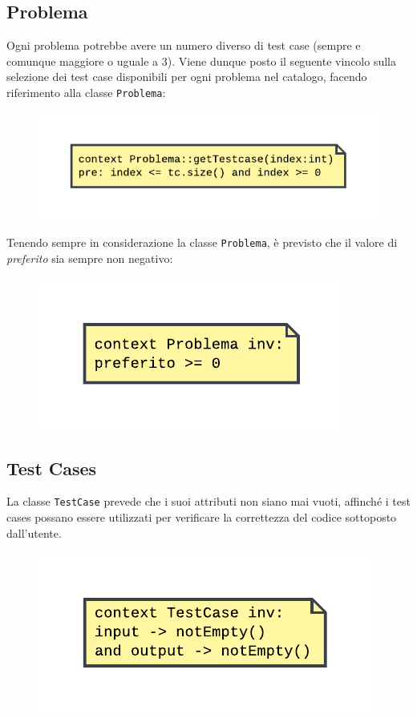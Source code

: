 \documentclass[11pt, a4paper]{article}
\theoremstyle{definition} %
\begin{document}
\subsection{Problema}
Ogni problema potrebbe avere un numero diverso di test case (sempre e
comunque maggiore o uguale a 3). Viene dunque posto il seguente vincolo
sulla selezione dei test case disponibili per ogni problema nel catalogo,
facendo riferimento alla classe \texttt{Problema}:
\begin{figure}[H]
\centering
\includegraphics[scale = 1.1]{materiale/ocl-problemaindicetc.pdf}
\end{figure}

\noindent Tenendo sempre in considerazione la classe \texttt{Problema}, è
previsto che il valore di \textit{preferito} sia sempre non negativo:
\begin{figure}[H]
\centering
\includegraphics[scale = 1.1]{materiale/ocl-problemainv.pdf}
\end{figure}

\subsection{Test Cases}
La classe \texttt{TestCase} prevede che i suoi attributi non siano mai
vuoti, affinché i test cases possano essere utilizzati per verificare
la correttezza del codice sottoposto dall'utente.

\begin{figure}[H]
\centering
\includegraphics[scale = 1.1]{materiale/ocl-testcase.pdf}
\end{figure}
\end{document}
